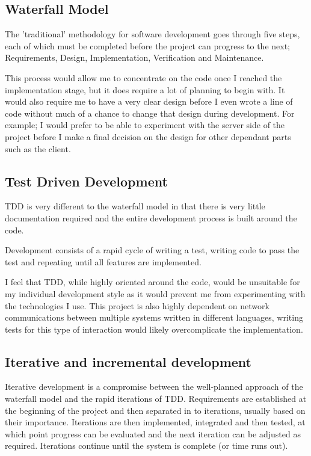 \documentclass[a4papert,11pt,notitlepage]{ltxdoc}
\begin{document}
\subsection{Waterfall Model}
The 'traditional' methodology for software development goes through five steps, each of which must be completed before the project can progress to the next; Requirements, Design, Implementation, Verification and Maintenance.

This process would allow me to concentrate on the code once I reached the implementation stage, but it does require a lot of planning to begin with. It would also require me to have a very clear design before I even wrote a line of code without much of a chance to change that design during development. For example; I would prefer to be able to experiment with the server side of the project before I make a final decision on the design for other dependant parts such as the client.

\subsection{Test Driven Development}
TDD is very different to the waterfall model in that there is very little documentation required and the entire development process is built around the code.

Development consists of a rapid cycle of writing a test, writing code to pass the test and repeating until all features are implemented.

I feel that TDD, while highly oriented around the code, would be unsuitable for my individual development style as it would prevent me from experimenting with the technologies I use. This project is also highly dependent on network communications between multiple systems written in different languages, writing tests for this type of interaction would likely overcomplicate the implementation.

\subsection{Iterative and incremental development}
Iterative development is a compromise between the well-planned approach of the waterfall model and the rapid iterations of TDD. Requirements are established at the beginning of the project and then separated in to iterations, usually based on their importance. Iterations are then implemented, integrated and then tested, at which point progress can be evaluated and the next iteration can be adjusted as required. Iterations continue until the system is complete (or time runs out).
\end{document}
